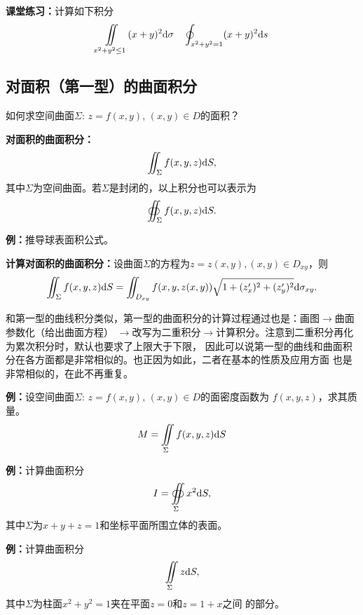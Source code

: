 {\bf 课堂练习：}计算如下积分
$$
	\iint\limits_{x^2+y^2\leq 1}(x+y)^2\mathrm{d}\sigma
	\quad
	\oint_{x^2+y^2=1}(x+y)^2\mathrm{d} s
$$

\subsection{对面积（第一型）的曲面积分}

如何求空间曲面$\Sigma:\,z=f(x,y),\,(x,y)\in D$的面积？


\begin{thx}
	{\bf 对面积的曲面积分：}
	$$\iint_{\Sigma}f(x,y,z)\mathrm{d} S,$$
	其中$\Sigma$为空间曲面。若$\Sigma$是封闭的，以上积分也可以表示为
	$$\oiint_{\Sigma}f(x,y,z)\mathrm{d} S.$$
\end{thx}

{\bf 例：}推导球表面积公式。

\begin{thx}
	{\bf 计算对面积的曲面积分：}设曲面$\Sigma$的方程为$z=z(x,y),(x,y)\in D_{xy}$，则
	$$\iint_{\Sigma}f(x,y,z)\mathrm{d} S
	=\iint_{D_{xy}}f(x,y,z(x,y))\sqrt{1+(z'_x)^2+(z'_y)^2}\mathrm{d}\sigma_{xy}.$$
\end{thx}
和第一型的曲线积分类似，第一型的曲面积分的计算过程通过也是：画图$\to$曲面参数化（给出曲面方程）
$\to$改写为二重积分$\to$计算积分。注意到二重积分再化为累次积分时，默认也要求了上限大于下限，
因此可以说第一型的曲线和曲面积分在各方面都是非常相似的。也正因为如此，二者在基本的性质及应用方面
也是非常相似的，在此不再重复。

{\bf 例：}设空间曲面$\Sigma:\,z=f(x,y),\,(x,y)\in D$的面密度函数为
$f(x,y,z)$，求其质量。
$${M=\iint\limits_{\Sigma}f(x,y,z)\mathrm{d} S}$$

{\bf 例：}计算曲面积分
$$I=\oiint\limits_{\Sigma}x^2\mathrm{d} S,$$
其中$\Sigma$为$x+y+z=1$和坐标平面所围立体的表面。

{\bf 例：}计算曲面积分
$$\iint\limits_{\Sigma}z\mathrm{d} S,$$
其中$\Sigma$为柱面$x^2+y^2=1$夹在平面$z=0$和$z=1+x$之间
的部分。

